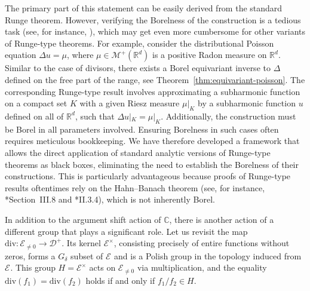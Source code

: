 \documentclass[12pt]{paper}
\numberwithin{equation}{section}
\theoremstyle{plain}
\theoremstyle{definition}
\newcommand{\C}{\mathbb{C}}
\newcommand{\Rd}{\mathbb{R}^{d}}
\newcommand{\measp}[2][]{\mathcal{M}_{#1}^+(#2)}
\newcommand{\holomnz}[1][]{\mathcal{E}^{\times}_{#1}}
\newcommand{\holom}[1][]{\mathcal{E}_{#1}}
\newcommand{\divis}[1][]{\mathcal{D}_{#1}}
\newcommand{\divisp}[1][]{\divis[#1]^{+}}
\newcommand{\dm}{\mathrm{div}}      %
\begin{document}
The primary part of this statement can be easily derived from the standard Runge theorem. However,
verifying the Borelness of the construction is a tedious task (see, for instance,
\cites{MR4025019,MR994977,MR236341}), which may get even more cumbersome for other variants of
Runge-type theorems.  For example, consider the distributional Poisson equation \(\Delta u = \mu\),
where \(\mu \in \measp{\Rd}\) is a positive Radon measure on \(\Rd\).  Similar to the case of
divisors, there exists a Borel equivariant inverse to \(\Delta\) defined on the free part of the
range, see Theorem~\ref{thm:equivariant-poisson}.  The corresponding Runge-type result involves
approximating a subharmonic function on a compact set \(K\) with a given Riesz measure \(\mu|_{K}\)
by a subharmonic function \(u\) defined on all of \(\Rd\), such that
\(\Delta u|_{K} = \mu|_{K}\).  Additionally, the construction must be Borel in all parameters
involved.  Ensuring Borelness in such cases often requires meticulous bookkeeping.  We have
therefore developed a framework that allows the direct application of standard analytic versions of
Runge-type theorems as black boxes, eliminating the need to establish the Borelness of their
constructions.  This is particularly advantageous because proofs of Runge-type results oftentimes
rely on the Hahn–Banach theorem (see, for instance, \cite{MR1070713}*{Section~III.8} and
\cite{Hormander2004-vz}*{II.3.4}), which is not inherently Borel.

In addition to the argument shift action of \(\C\), there is another action of a different group
that plays a significant role.  Let us revisit the map \(\dm : \holom[\ne 0] \to \divisp\).  Its
kernel \(\holomnz\), consisting precisely of entire functions without zeros, forms a \(G_{\delta}\)
subset of \(\holom\) and is a Polish group in the topology induced from \(\holom\). This group
\(H = \holomnz\) acts on \(\holom[\ne 0]\) via multiplication, and the equality
\(\dm(f_{1}) = \dm(f_{2})\) holds if and only if \(f_{1}/f_{2} \in H\).
\end{document}
